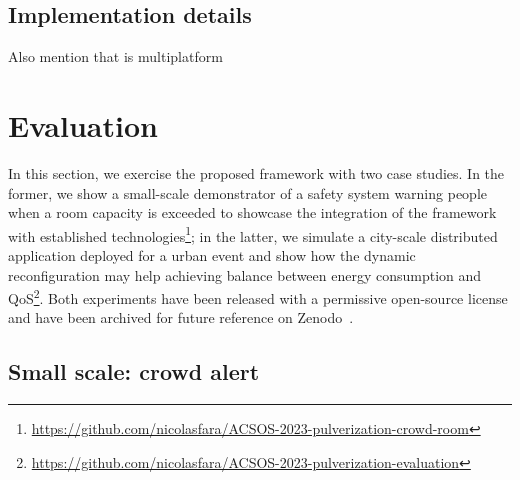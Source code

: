 \documentclass[conference]{IEEEtran}
\begin{document}


\subsection{Implementation details}

Also mention that is multiplatform

\section{Evaluation}\label{sec:evaluation}

In this section,
we exercise the proposed framework with two case studies.
%
In the former,
we show a small-scale demonstrator of a safety system warning people when a room capacity is exceeded
to showcase the integration of the framework with established technologies\footnote{
    \url{https://github.com/nicolasfara/ACSOS-2023-pulverization-crowd-room}
};
in the latter,
we simulate a city-scale distributed application deployed for a urban event
and show how the dynamic reconfiguration may help achieving balance between energy consumption and QoS\footnote{
    \url{https://github.com/nicolasfara/ACSOS-2023-pulverization-evaluation}
}.
%
Both experiments have been released with a permissive open-source license and have been archived for future reference on Zenodo~\cite{TBD}.

\subsection{Small scale: crowd alert}
\label{sec:small-scale-crowd-alert}
\end{document}
